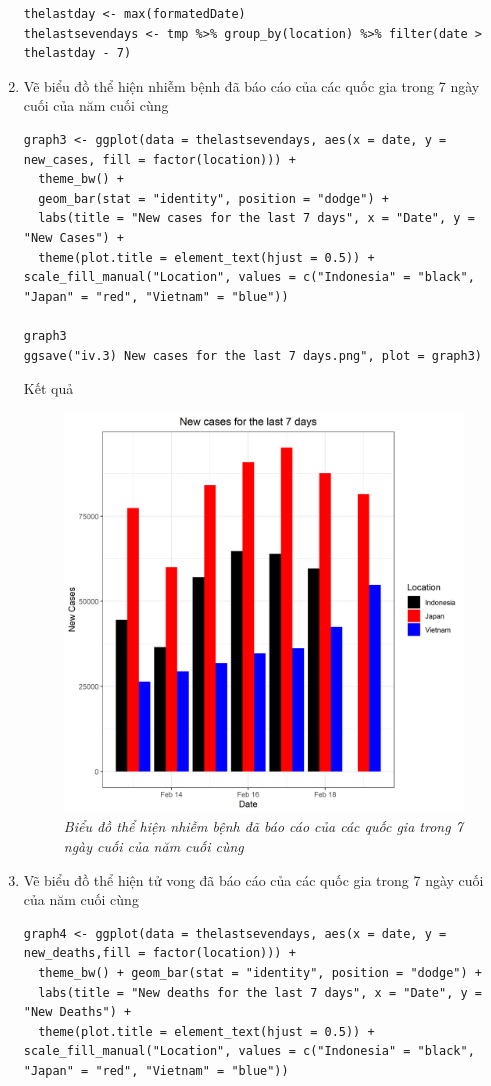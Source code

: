 \documentclass[a4paper]{article}
\theoremstyle{definition}
\begin{document}
\begin{enumerate}[1)]
\begin{lstlisting}
thelastday <- max(formatedDate)
thelastsevendays <- tmp %>% group_by(location) %>% filter(date > thelastday - 7)
\end{lstlisting}
\item Vẽ biểu đồ thể hiện nhiễm bệnh đã báo cáo của các quốc gia trong 7 ngày cuối của năm cuối cùng
\begin{lstlisting}
graph3 <- ggplot(data = thelastsevendays, aes(x = date, y = new_cases, fill = factor(location))) +
  theme_bw() +
  geom_bar(stat = "identity", position = "dodge") +
  labs(title = "New cases for the last 7 days", x = "Date", y = "New Cases") +
  theme(plot.title = element_text(hjust = 0.5)) + scale_fill_manual("Location", values = c("Indonesia" = "black", "Japan" = "red", "Vietnam" = "blue"))

graph3
ggsave("iv.3) New cases for the last 7 days.png", plot = graph3)
\end{lstlisting}
Kết quả
    \begin{figure}[H]
        \begin{center}
            \includegraphics[scale=0.7]{iv/iv.3) New cases for the last 7 days.png}
        \end{center}
        \vspace{+3mm}\caption{\it Biểu đồ thể hiện nhiễm bệnh đã báo cáo của các quốc gia trong 7 ngày cuối của năm cuối cùng}
    \end{figure}
\item Vẽ biểu đồ thể hiện tử vong đã báo cáo của các quốc gia trong 7 ngày cuối của năm cuối cùng
\begin{lstlisting}
graph4 <- ggplot(data = thelastsevendays, aes(x = date, y = new_deaths,fill = factor(location))) +
  theme_bw() + geom_bar(stat = "identity", position = "dodge") +
  labs(title = "New deaths for the last 7 days", x = "Date", y = "New Deaths") +
  theme(plot.title = element_text(hjust = 0.5)) + scale_fill_manual("Location", values = c("Indonesia" = "black", "Japan" = "red", "Vietnam" = "blue"))


\end{lstlisting}
\end{enumerate}
\end{document}
